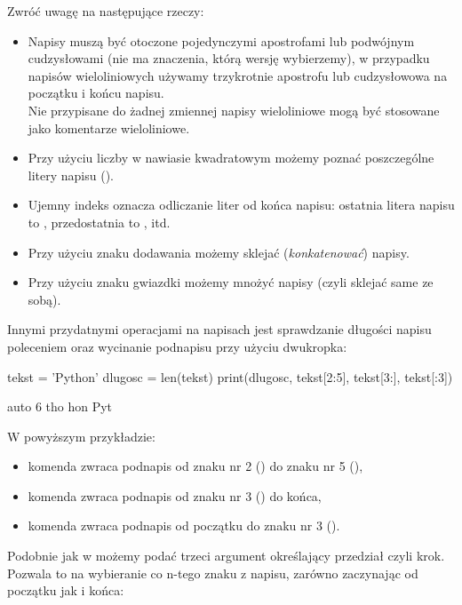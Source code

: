 \documentclass{pdfBooklets}
\begin{document}
\pagebreak[2]\noindent
Zwróć uwagę na następujące rzeczy:
\begin{itemize}
\item Napisy muszą być otoczone pojedynczymi apostrofami lub podwójnym cudzysłowami (nie ma znaczenia,
	którą wersję wybierzemy), w przypadku napisów wieloliniowych używamy trzykrotnie apostrofu lub cudzysłowowa na początku i końcu napisu.\\
	Nie przypisane do żadnej zmiennej napisy wieloliniowe mogą być stosowane jako komentarze wieloliniowe.
\item Przy użyciu liczby w nawiasie kwadratowym możemy poznać poszczególne litery napisu ().
\item Ujemny indeks oznacza odliczanie liter od końca napisu: ostatnia litera napisu  to ,
	przedostatnia to , itd.
\item Przy użyciu znaku dodawania możemy sklejać (\emph{konkatenować}) napisy.
\item Przy użyciu znaku gwiazdki możemy mnożyć napisy (czyli sklejać same ze sobą).
\end{itemize}
Innymi przydatnymi operacjami na napisach jest sprawdzanie długości napisu poleceniem 
oraz wycinanie podnapisu przy użyciu dwukropka:

\begin{CodeFrame}[python]{.7\textwidth}
tekst = 'Python'
dlugosc = len(tekst)
print(dlugosc, tekst[2:5], tekst[3:], tekst[:3])
\end{CodeFrame}
\begin{CodeFrame}{auto}
6 tho hon Pyt
\end{CodeFrame}

\pagebreak[2]\noindent
W powyższym przykładzie:
\begin{itemize}
\item komenda  zwraca podnapis od znaku nr 2 () do znaku nr 5 
(),
\item komenda  zwraca podnapis od znaku nr 3 () do końca, 
\item komenda  zwraca podnapis od początku do znaku nr 3 
().
\end{itemize}

Podobnie jak w  możemy podać trzeci argument określający przedział czyli krok.
Pozwala to na wybieranie co n-tego znaku z napisu, zarówno zaczynając od początku jak i końca:
\end{document}
